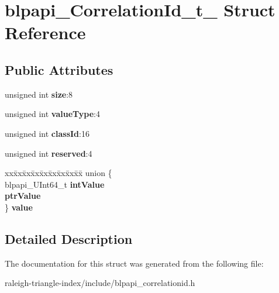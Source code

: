 \section{blpapi\+\_\+\+Correlation\+Id\+\_\+t\+\_\+ Struct Reference}
\label{structblpapi___correlation_id__t__}
\subsection*{Public Attributes}
\begin{DoxyCompactItemize}
\item 
unsigned int {\bfseries size}\+:8\label{structblpapi___correlation_id__t___abef27e4a792faf00f4306d93788d0051}

\item 
unsigned int {\bfseries value\+Type}\+:4\label{structblpapi___correlation_id__t___ab7bce6fc7b549d65d62ba08d66a800bc}

\item 
unsigned int {\bfseries class\+Id}\+:16\label{structblpapi___correlation_id__t___abd17f7805ce2ed86072862ab07c6225e}

\item 
unsigned int {\bfseries reserved}\+:4\label{structblpapi___correlation_id__t___a45f729e0cacecfdf391abf228a261e2a}

\item 
\begin{tabbing}
xx\=xx\=xx\=xx\=xx\=xx\=xx\=xx\=xx\=\kill
union \{\\
\>blpapi\_UInt64\_t {\bfseries intValue}\\
 {\bfseries ptrValue}\\
\} {\bfseries value}\label{structblpapi___correlation_id__t___aede39fa56134d13faf86f52b10798e98}
\\

\end{tabbing}\end{DoxyCompactItemize}


\subsection{Detailed Description}


The documentation for this struct was generated from the following file\+:\begin{DoxyCompactItemize}
\item 
raleigh-\/triangle-\/index/include/blpapi\+\_\+correlationid.\+h\end{DoxyCompactItemize}
